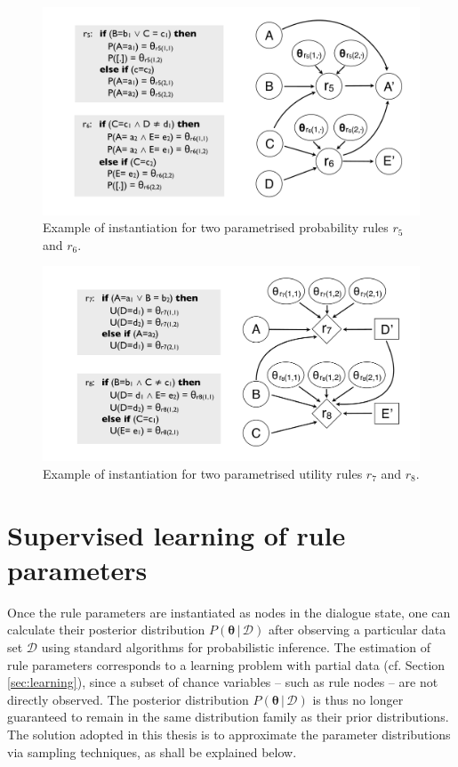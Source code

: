 \begin{figure}[h!]
\centering
\includegraphics[scale=0.25]{imgs/ruleinstantiation_params.pdf}
\caption{Example of instantiation for two parametrised probability rules $r_5$ and $r_6$.}
\label{fig:ruleinstantiation_params}
\end{figure}


\begin{figure}[h!]
\centering
\includegraphics[scale=0.25]{imgs/ruleinstantiation2_params.pdf}
\caption{Example of instantiation for two parametrised utility rules $r_7$ and $r_8$.}
\label{fig:ruleinstantiation_params2}
\end{figure}

\section{Supervised learning of rule parameters}
\label{sec:rule-supervised}

Once the rule parameters are instantiated as nodes in the dialogue state, one can calculate their posterior distribution $P(\boldsymbol\theta \, | \, \mathcal{D})$ after observing a particular data set $\mathcal{D}$ using standard algorithms for probabilistic inference. The estimation of rule parameters corresponds to a learning problem with partial data (cf. Section \ref{sec:learning}), since a subset of chance variables -- such as rule nodes -- are not directly observed. The posterior distribution $P(\boldsymbol\theta \, | \, \mathcal{D})$ is thus no longer guaranteed to remain in the same distribution family as their prior distributions.  The solution adopted in this thesis is to approximate the parameter distributions via sampling techniques, as shall be explained below. 

